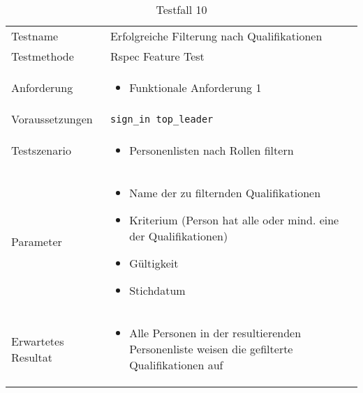 \begin{table}[h!]
   \begin{tabular}{|L{0.4\textwidth}|L{0.6\textwidth}|}
       \hline
         \\[12pt]
       \hline
        Testname & Erfolgreiche Filterung nach Qualifikationen \\
       \hline
       Testmethode & Rspec Feature Test \\
       \hline
        Anforderung & 
        \begin{itemize}
         \item Funktionale Anforderung 1
         \end{itemize}  \\
       \hline
       Voraussetzungen & \texttt{sign\_in top\_leader} \\
       \hline
       Testszenario & 
       \begin{itemize}
         \item Personenlisten nach Rollen filtern
       \end{itemize} \\
       \hline
       Parameter & 
       \begin{itemize}
         \item Name der zu filternden Qualifikationen
         \item Kriterium (Person hat alle oder mind. eine der Qualifikationen)
         \item Gültigkeit
         \item Stichdatum
       \end{itemize} \\
       \hline
       Erwartetes Resultat & 
       \begin{itemize}
         \item Alle Personen in der resultierenden Personenliste weisen die gefilterte Qualifikationen auf
       \end{itemize} \\
     \hline
     \end{tabular}
     \caption{Testfall 10}
\end{table}

\newpage

